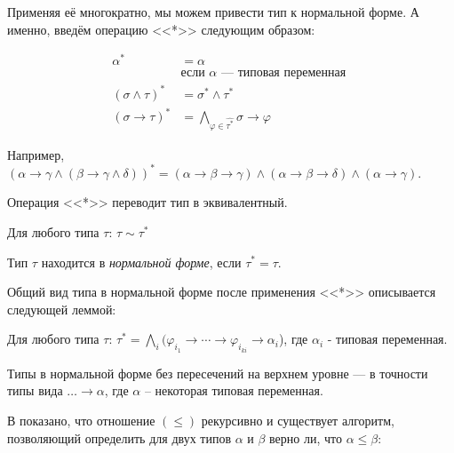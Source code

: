 \documentclass[../main.tex]{subfiles}
\begin{document}
Применяя её многократно, мы можем привести тип к нормальной форме. А именно, введём операцию <<*>> следующим образом: 

\begin{definition}
\begin{align*}
\alpha^* &= \alpha \\
    &\text{если $\alpha$ --- типовая переменная }\\
(\sigma \wedge \tau)^* &= \sigma^* \wedge \tau^*\\
(\sigma \to \tau)^* &= \bigwedge \limits_{\varphi \in \hat{\tau^*}} \sigma \to \varphi
\end{align*}
\end{definition}

Например, $(\alpha \to \gamma \wedge (\beta \to \gamma \wedge \delta))^* = (\alpha \to \beta \to \gamma) \wedge (\alpha \to \beta \to \delta) \wedge (\alpha \to \gamma)$.

Операция <<*>> переводит тип в эквивалентный.

\begin{lemma} \label{normal form}
Для любого типа $\tau$: $\tau \sim \tau^*$
\end{lemma}


\begin{definition}
Тип $\tau$ находится в {\it нормальной форме}, если $\tau^* = \tau$.
\end{definition}

Общий вид типа в нормальной форме после применения <<*>> описывается следующей леммой:

\begin{lemma}
Для любого типа $\tau$: $\tau^* = \bigwedge \limits_i (\varphi_i_1 \to \cdots \to \varphi_i_{k i} \to \alpha_i$), где $\alpha_i$ - типовая переменная.
\end{lemma}

\begin{corollary} \label{normal form unit}
Типы в нормальной форме без пересечений на верхнем уровне --- в точности типы вида $\dots \to \alpha$, где $\alpha$ -- некоторая типовая переменная.
\end{corollary}

В \cite{hindley_1982} показано, что отношение $(\leqslant)$ рекурсивно и существует алгоритм, позволяющий определить для двух типов $\alpha$ и $\beta$ верно ли, что $\alpha \leqslant \beta$:
\end{document}
